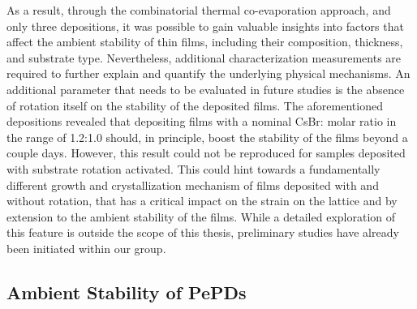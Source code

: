 As a result, through the combinatorial thermal co-evaporation approach, and only three depositions, it was possible to gain valuable insights into factors that affect the ambient stability of  thin films, including their composition, thickness, and substrate type. Nevertheless, additional characterization measurements are required to further explain and quantify the underlying physical mechanisms. An additional parameter that needs to be evaluated in future studies is the absence of rotation itself on the stability of the deposited films. The aforementioned depositions revealed that depositing films with a nominal CsBr: molar ratio in the range of 1.2:1.0 should, in principle, boost the stability of the films beyond a couple days. However, this result could not be reproduced for samples deposited with substrate rotation activated. This could hint towards a fundamentally different growth and crystallization mechanism of films deposited with and without rotation, that has a critical impact on the strain on the lattice and by extension to the ambient stability of the films. While a detailed exploration of this feature is outside the scope of this thesis, preliminary studies have already been initiated within our group.


\subsection{Ambient Stability of PePDs}


